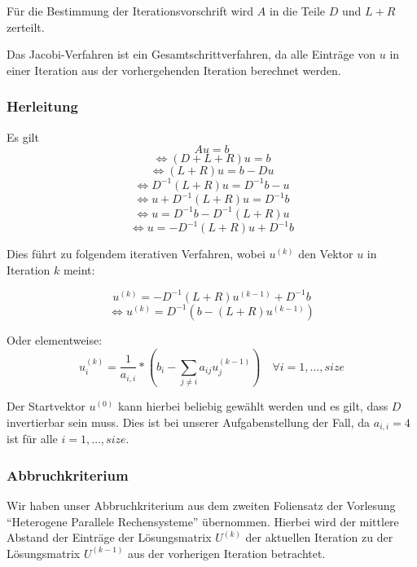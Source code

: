 \documentclass{article}
\begin{document}
Für die Bestimmung der Iterationsvorschrift wird $A$ in die Teile $D$ und $L+R$ zerteilt.

Das Jacobi-Verfahren ist ein Gesamtschrittverfahren, da alle Einträge von $u$ in einer Iteration aus der vorhergehenden Iteration berechnet werden.


\subsubsection{Herleitung}
Es gilt
$$Au = b$$
$$\Leftrightarrow (D+L+R)u = b$$
$$\Leftrightarrow (L+R)u = b - Du$$
$$\Leftrightarrow D^{-1}(L+R)u = D^{-1}b - u$$
$$\Leftrightarrow u + D^{-1}(L+R)u = D^{-1}b$$
$$\Leftrightarrow u = D^{-1}b - D^{-1}(L+R)u$$
$$\Leftrightarrow u = - D^{-1}(L+R)u + D^{-1}b$$

Dies führt zu folgendem iterativen Verfahren, wobei $u^{(k)}$ den Vektor $u$ in Iteration $k$ meint:

$$u^{(k)} = -D^{-1}(L+R)  u^{(k-1)} + D^{-1}b$$
$$\Leftrightarrow u^{(k)} = D^{-1}  \left(b -(L+R)  u^{(k-1)}\right)$$

Oder elementweise:
$$u_i^{(k)} = \frac{1}{a_{i,i}} * (b_i - \sum_{j \neq i}{a_{ij} u_j^{(k-1)}}) \quad \forall i = 1, \ldots, size$$

Der Startvektor $u^{(0)}$ kann hierbei beliebig gewählt werden und es gilt, dass $D$ invertierbar sein muss. Dies ist bei unserer Aufgabenstellung der Fall, da $a_{i,i} = 4$ ist für alle $i = 1, \ldots, size$.

\subsubsection{Abbruchkriterium} \label{jacobi:abbruch}
Wir haben unser Abbruchkriterium aus dem zweiten Foliensatz der Vorlesung ``Heterogene Parallele Rechensysteme'' übernommen. Hierbei wird der mittlere Abstand der Einträge der Lösungsmatrix $U^{(k)}$ der aktuellen Iteration zu der Lösungsmatrix $U^{(k-1)}$ aus der vorherigen Iteration betrachtet.

\end{document}
